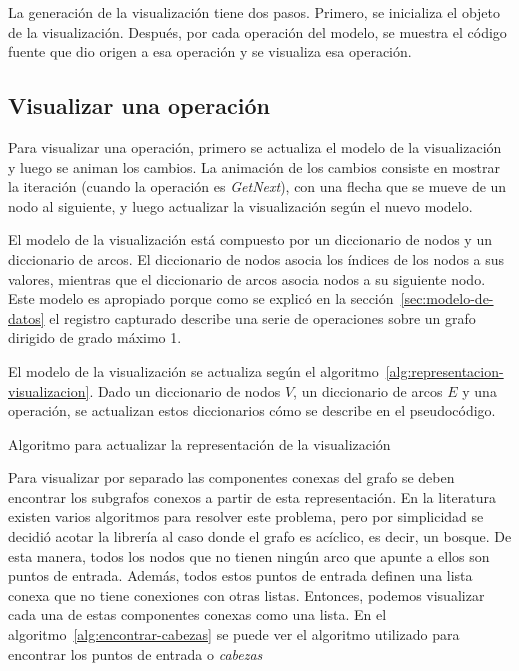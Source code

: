La generación de la visualización tiene dos pasos. Primero, se inicializa el objeto de la visualización. Después, por cada operación del modelo, se muestra el código fuente que dio origen a esa operación y se visualiza esa operación.

\subsection{Visualizar una operación}

Para visualizar una operación, primero se actualiza el modelo de la visualización y luego se animan los cambios. La animación de los cambios consiste en mostrar la iteración (cuando la operación es \textit{GetNext}), con una flecha que se mueve de un nodo al siguiente, y luego actualizar la visualización según el nuevo modelo.

El modelo de la visualización está compuesto por un diccionario de nodos y un diccionario de arcos. El diccionario de nodos asocia los índices de los nodos a sus valores, mientras que el diccionario de arcos asocia nodos a su siguiente nodo. Este modelo es apropiado porque como se explicó en la sección~\ref{sec:modelo-de-datos} el registro capturado describe una serie de operaciones sobre un grafo dirigido de grado máximo 1.

El modelo de la visualización se actualiza según el algoritmo~\ref{alg:representacion-visualizacion}. Dado un diccionario de nodos $V$, un diccionario de arcos $E$ y una operación, se actualizan estos diccionarios cómo se describe en el pseudocódigo.

\begin{algorithm}[htb]
  \caption{Algoritmo para actualizar la representación de la visualización}
  \label{alg:representacion-visualizacion}
  \begin{algorithmic}[1]
      \State {}
      \State {}
      \State {}
      \State {}
    \EndIf
  \EndFunction
  \end{algorithmic}
\end{algorithm}

Para visualizar por separado las componentes conexas del grafo se deben encontrar los subgrafos conexos a partir de esta representación. En la literatura existen varios algoritmos para resolver este problema, pero por simplicidad se decidió acotar la librería al caso donde el grafo es acíclico, es decir, un bosque. De esta manera, todos los nodos que no tienen ningún arco que apunte a ellos son puntos de entrada. Además, todos estos puntos de entrada definen una lista conexa que no tiene conexiones con otras listas. Entonces, podemos visualizar cada una de estas componentes conexas como una lista. En el algoritmo~\ref{alg:encontrar-cabezas} se puede ver el algoritmo utilizado para encontrar los puntos de entrada o \textit{cabezas}


